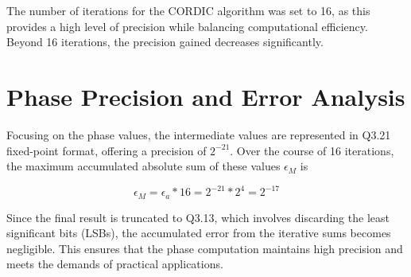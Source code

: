 The number of iterations for the CORDIC algorithm was set to 16, as this provides a high level of precision while balancing computational efficiency. Beyond 16 iterations, the precision gained decreases significantly.

\section{Phase Precision and Error Analysis}
Focusing on the phase values, the intermediate values are represented in Q3.21 fixed-point format, offering a precision of \(2^{-21}\). Over the course of 16 iterations, the maximum accumulated absolute sum of these values \( \epsilon_M \) is

\[
    \epsilon_M = \epsilon_a * 16 = 2^{-21} * 2^{4} = 2^{-17}
\]

Since the final result is truncated to Q3.13, which involves discarding the least significant bits (LSBs), the accumulated error from the iterative sums becomes negligible. This ensures that the phase computation maintains high precision and meets the demands of practical applications.